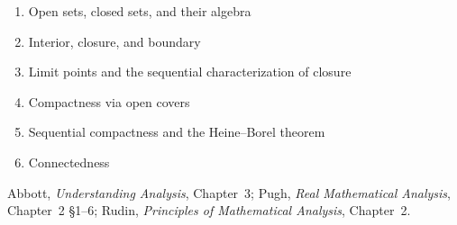 \begin{enumerate}
  \item Open sets, closed sets, and their algebra
  \item Interior, closure, and boundary
  \item Limit points and the sequential characterization of closure
  \item Compactness via open covers
  \item Sequential compactness and the Heine--Borel theorem
  \item Connectedness
\end{enumerate}

\begin{remark*}
Abbott, \textit{Understanding Analysis}, Chapter~3;
Pugh, \textit{Real Mathematical Analysis}, Chapter~2 §1--6;
Rudin, \textit{Principles of Mathematical Analysis}, Chapter~2.
\end{remark*}



% 
% 
% 
% 
